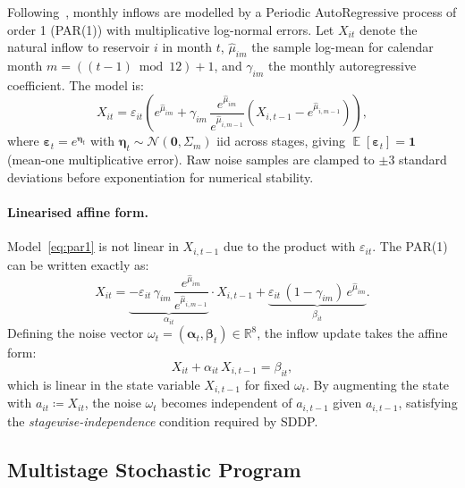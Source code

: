 \documentclass[11pt,letterpaper]{article}
\DeclareMathOperator{\E}{\mathbb{E}}
\newcommand{\bm}[1]{\boldsymbol{#1}}
\newcommand{\R}{\mathbb{R}}
\begin{document}
Following~\citet{shapiro2013}, monthly inflows are modelled by a Periodic
AutoRegressive process of order 1 (PAR(1)) with multiplicative log-normal errors.
Let $X_{it}$ denote the natural inflow to reservoir $i$ in month $t$,
$\hat{\mu}_{im}$ the sample log-mean for calendar month $m = ((t-1)\bmod 12)+1$,
and $\gamma_{im}$ the monthly autoregressive coefficient.
The model is:
\begin{equation}
  X_{it} = \varepsilon_{it}\!\left(
    e^{\hat{\mu}_{im}}
    + \gamma_{im}\,\frac{e^{\hat{\mu}_{im}}}{e^{\hat{\mu}_{i,m-1}}}
    \!\left(X_{i,t-1} - e^{\hat{\mu}_{i,m-1}}\right)
  \right),
  \label{eq:par1}
\end{equation}
where $\bm{\varepsilon}_t = e^{\bm{\eta}_t}$ with
$\bm{\eta}_t \sim \mathcal{N}(\mathbf{0}, \Sigma_m)$ iid across stages,
giving $\E[\bm{\varepsilon}_t] = \mathbf{1}$ (mean-one multiplicative error).
Raw noise samples are clamped to $\pm 3$ standard deviations before
exponentiation for numerical stability.

\paragraph{Linearised affine form.}
Model~\eqref{eq:par1} is not linear in $X_{i,t-1}$ due to the product
with $\varepsilon_{it}$.  The PAR(1) can be written exactly as:
\begin{equation}
  X_{it} = \underbrace{-\varepsilon_{it}\,\gamma_{im}\,
            \frac{e^{\hat{\mu}_{im}}}{e^{\hat{\mu}_{i,m-1}}}}_{\alpha_{it}}
            \cdot X_{i,t-1}
            + \underbrace{\varepsilon_{it}\,(1-\gamma_{im})\,e^{\hat{\mu}_{im}}}_{\beta_{it}}.
  \label{eq:par1_linear}
\end{equation}
Defining the noise vector $\omega_t = (\bm{\alpha}_t, \bm{\beta}_t) \in \R^8$,
the inflow update takes the affine form:
\begin{equation}
  X_{it} + \alpha_{it}\,X_{i,t-1} = \beta_{it},
  \label{eq:inflow_sddp}
\end{equation}
which is linear in the state variable $X_{i,t-1}$ for fixed $\omega_t$.
By augmenting the state with $a_{it} \coloneqq X_{it}$, the noise $\omega_t$
becomes independent of $a_{i,t-1}$ given $a_{i,t-1}$, satisfying the
\emph{stagewise-independence} condition required by SDDP.

\subsection{Multistage Stochastic Program}
\label{sec:msp}
\end{document}
